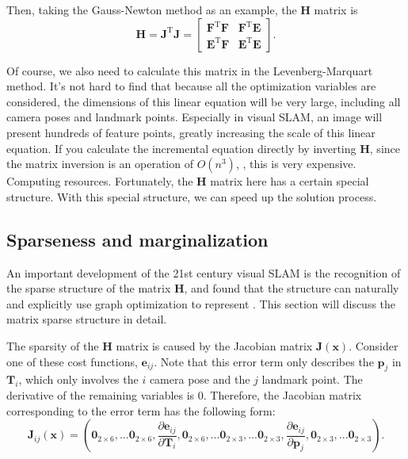 Then, taking the Gauss-Newton method as an example, the $\bm{H}$ matrix is
\begin{equation}\label{eq:HessianMatrix}
\bm{H} = \bm{J}^\mathrm{T}\bm{J} =
\begin{bmatrix}
         \bm{F}^\mathrm{T}\bm{F}   &   \bm{F}^\mathrm{T}\bm{E}   \\ 
         \bm{E}^\mathrm{T}\bm{F}   &   \bm{E}^\mathrm{T}\bm{E}
\end{bmatrix} .
\end{equation}

Of course, we also need to calculate this matrix in the Levenberg-Marquart method. It's not hard to find that because all the optimization variables are considered, the dimensions of this linear equation will be very large, including all camera poses and landmark points. Especially in visual SLAM, an image will present hundreds of feature points, greatly increasing the scale of this linear equation. If you calculate the incremental equation directly by inverting $\bm{H}$, since the matrix inversion is an operation of $O(n^3)$, \textsuperscript{\cite{Sueli2003}}, this is very expensive. Computing resources. Fortunately, the $\bm{H}$ matrix here has a certain special structure. With this special structure, we can speed up the solution process.

\subsection{Sparseness and marginalization}
An important development of the 21st century visual SLAM is the recognition of the sparse structure of the matrix $\bm{H}$, and found that the structure can naturally and explicitly use graph optimization to represent \textsuperscript{\cite{Kummerle2011, Polok2013}}. This section will discuss the matrix sparse structure in detail.

The sparsity of the $\bm{H}$ matrix is ​​caused by the Jacobian matrix $\bm{J}(\bm{x})$. Consider one of these cost functions, $\bm{e}_{ij}$. Note that this error term only describes the $\bm{p}_j$ in $\bm{T}_i$, which only involves the $i$ camera pose and the $j$ landmark point. The derivative of the remaining variables is 0. Therefore, the Jacobian matrix corresponding to the error term has the following form:
\begin{equation}
\bm{J}_{ij}(\bm{x}) = \left(
\bm{0}_{2 \times 6},...
\bm{0}_{2 \times 6},
\frac{\partial \bm{e}_{ij}}{\partial \bm{T}_i},
\bm{0}_{2 \times 6},...
\bm{0}_{2 \times 3},...
\bm{0}_{2 \times 3},
\frac{\partial \bm{e}_{ij}}{ \partial \bm{p}_j},
\bm{0}_{2 \times 3},...
\bm{0}_{2 \times 3} 
\right) .
\end{equation}

